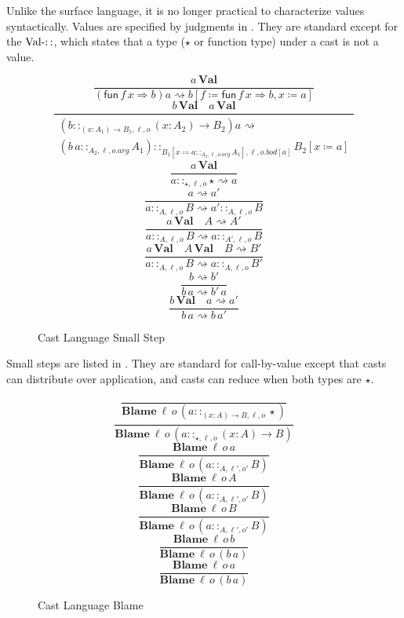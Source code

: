 Unlike the surface language, it is no longer practical to characterize values syntactically.
Values are specified by judgments in . 
They are standard except for the $\operatorname{Val-::}$, which states that a type ($\star$ or function type) under a cast is not a value.

\begin{figure}
\[
\frac{a\,\textbf{Val}}{\left(\mathsf{fun}\,f\,x\Rightarrow b\right)a\rightsquigarrow b\left[f\coloneqq\mathsf{fun}\,f\,x\Rightarrow b,x\coloneqq a\right]}
\]
\[
\frac{b\,\textbf{Val}\quad a\,\textbf{Val}}{\begin{array}{c}
\left(b::_{\left(x:A_{1}\right)\rightarrow B_{1},\ell ,o}\left(x:A_{2}\right)\rightarrow B_{2}\right)a\rightsquigarrow\\
\left(b\,a::_{A_{2},\ell,o.arg}A_{1}\right)::_{B_{1}\left[x\coloneqq a::_{A_{2},\ell,o.arg}A_{1}\right],\ell ,o.bod[a]}B_{2}\left[x\coloneqq a\right]
\end{array}}
\]
\[
\frac{a\,\textbf{Val}}{a::_{\star,\ell ,o}\star\rightsquigarrow a}
\]
\[
\frac{a\rightsquigarrow a'}{a::_{A,\ell ,o}B\rightsquigarrow a'::_{A,\ell ,o}B}
\]
\[
\frac{a\,\textbf{Val}\quad A\rightsquigarrow A'}{a::_{A,\ell ,o}B\rightsquigarrow a::_{A',\ell ,o}B}
\]
\[
\frac{a\,\textbf{Val}\quad A\,\textbf{Val}\quad B\rightsquigarrow B'}{a::_{A,\ell ,o}B\rightsquigarrow a::_{A,\ell ,o}B'}
\]
\[
\frac{b\rightsquigarrow b'}{b\,a\rightsquigarrow b'\,a}
\]
\[
\frac{b\,\textbf{Val}\quad a\rightsquigarrow a'}{b\,a\rightsquigarrow b\,a'}
\]

\caption{Cast Language Small Step}
\label{fig:cast-step}
\end{figure}

Small steps are listed in .
They are standard for call-by-value except that casts can distribute over application, and casts can reduce when both types are $\star$.

\begin{figure}
\[
\frac{\,}{\textbf{Blame}\:\ell \,o\,\left(a::_{\left(x:A\right)\rightarrow B,\ell ,o}\star\right)}
\]
\[
\frac{\,}{\textbf{Blame}\:\ell \,o\,\left(a::_{\star,\ell ,o}\left(x:A\right)\rightarrow B\right)}
\]
\[
\frac{\textbf{Blame}\:\ell \,o\,a}{\textbf{Blame}\:\ell \,o\,\left(a::_{A,\ensuremath{\ell'},o'}B\right)}
\]
\[
\frac{\textbf{Blame}\:\ell \,o\,A}{\textbf{Blame}\:\ell \,o\,\left(a::_{A,\ensuremath{\ell'},o'}B\right)}
\]
\[
\frac{\textbf{Blame}\:\ell \,o\,B}{\textbf{Blame}\:\ell \,o\,\left(a::_{A,\ensuremath{\ell'},o'}B\right)}
\]
\[
\frac{\textbf{Blame}\:\ell \,o\,b}{\textbf{Blame}\:\ell \,o\,\left(b\,a\right)}
\]
\[
\frac{\textbf{Blame}\:\ell \,o\,a}{\textbf{Blame}\:\ell \,o\,\left(b\,a\right)}
\]
\caption{Cast Language Blame}
\label{fig:cast-blame}
\end{figure}

